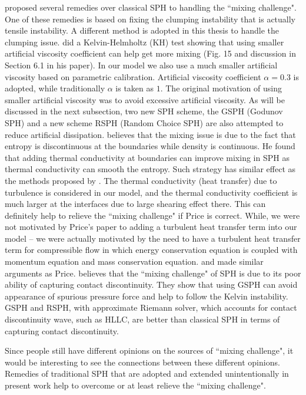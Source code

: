 \citet{read2010resolving} proposed several remedies over classical SPH to handling the ``mixing challenge". One of these remedies is based on fixing the clumping instability that is actually tensile instability. A different method \citep{chen1999improvement} is adopted in this thesis to handle the clumping issue. \citet{agertz2007fundamental} did a Kelvin-Helmholtz (KH) test showing that using smaller artificial viscosity coefficient can help get more mixing (Fig. 15 and discussion in Section 6.1 in his paper). In our model we also use a much smaller artificial viscosity based on parametric calibration. Artificial viscosity coefficient $\alpha =0.3$ is adopted, while traditionally $\alpha$ is taken as $1$. The original motivation of using smaller artificial viscosity was to avoid excessive artificial viscosity. As will be discussed in the next subsection, two new SPH scheme, the GSPH (Godunov SPH) and a new scheme RSPH (Random Choice SPH) are also attempted to reduce artificial dissipation. \citet{price2008modelling} believes that the mixing issue is due to the fact that entropy is discontinuous at the boundaries while density is continuous. He found that adding thermal conductivity at boundaries can improve mixing in SPH as thermal conductivity can smooth the entropy. Such strategy has similar effect as the methods proposed by \citet{read2010resolving}. The thermal conductivity (heat transfer) due to turbulence is considered in our model, and the thermal conductivity coefficient is much larger at the interfaces due to large shearing effect there. This can definitely help to relieve the ``mixing challenge" if Price is correct. While, we were not motivated by Price's paper to adding a turbulent heat transfer term into our model -- we were actually motivated by the need to have a turbulent heat transfer term for compressible flow in which energy conservation equation is coupled with momentum equation and mass conservation equation.
\citet{wadsley2008treatment} and \citet{ritchie2001multiphase} made similar arguments as Price. \citet{borgani2012hydrodynamic} believes that the ``mixing challenge" of SPH is due to its poor ability of capturing contact discontinuity. They show that using GSPH can avoid appearance of spurious pressure force and help to follow the Kelvin instability. GSPH and RSPH, with approximate Riemann solver, which accounts for contact discontinuity wave, such as HLLC, are better than classical SPH in terms of capturing contact discontinuity.

Since people still have different opinions on the sources of ``mixing challenge", it would be interesting to see the connections between these different opinions. Remedies of traditional SPH that are adopted and extended unintentionally in present work help to overcome or at least relieve the ``mixing challenge".


